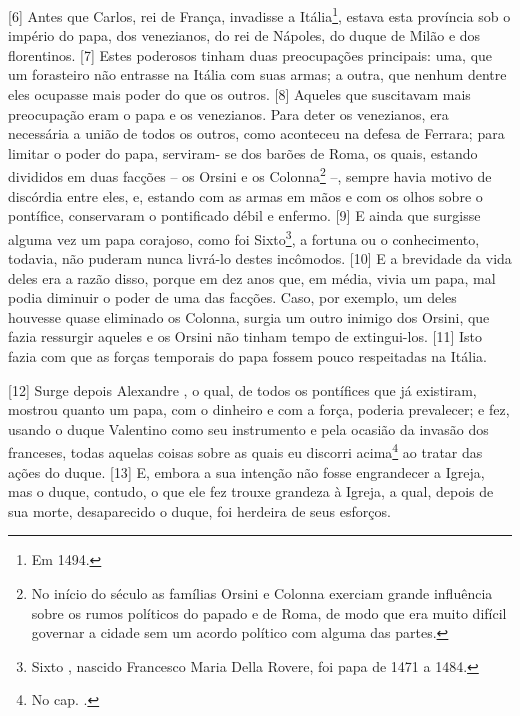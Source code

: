 {[}6{]} Antes que Carlos, rei de França, invadisse a Itália\footnote{Em
  1494.}, estava esta província sob o império do papa, dos venezianos,
do rei de Nápoles, do duque de Milão e dos florentinos. {[}7{]} Estes
poderosos tinham duas preocupações principais: uma, que um forasteiro
não entrasse na Itália com suas armas; a outra, que nenhum dentre eles
ocupasse mais poder do que os outros. {[}8{]} Aqueles que suscitavam
mais preocupação eram o papa e os venezianos. Para deter os venezianos,
era necessária a união de todos os outros, como aconteceu na defesa de
Ferrara; para limitar o poder do papa, serviram- se dos barões de Roma,
os quais, estando divididos em duas facções -- os Orsini e os
Colonna\footnote{No início do século  as famílias Orsini e Colonna
  exerciam grande influência sobre os rumos políticos do papado e de
  Roma, de modo que era muito difícil governar a cidade sem um acordo
  político com alguma das partes.} --, sempre havia motivo de discórdia
entre eles, e, estando com as armas em mãos e com os olhos sobre o
pontífice, conservaram o pontificado débil e enfermo. {[}9{]} E ainda
que surgisse alguma vez um papa corajoso, como foi Sixto\footnote{Sixto
  , nascido Francesco Maria Della Rovere, foi papa de 1471 a 1484.}, a
fortuna ou o conhecimento, todavia, não puderam nunca livrá-lo destes
incômodos. {[}10{]} E a brevidade da vida deles era a razão disso,
porque em dez anos que, em média, vivia um papa, mal podia diminuir o
poder de uma das facções. Caso, por exemplo, um deles houvesse quase
eliminado os Colonna, surgia um outro inimigo dos Orsini, que fazia
ressurgir aqueles e os Orsini não tinham tempo de extingui-los. {[}11{]}
Isto fazia com que as forças temporais do papa fossem pouco respeitadas
na Itália.

{[}12{]} Surge depois Alexandre , o qual, de todos os pontífices que
já existiram, mostrou quanto um papa, com o dinheiro e com a força,
poderia prevalecer; e fez, usando o duque Valentino como seu instrumento
e pela ocasião da invasão dos franceses, todas aquelas coisas sobre as
quais eu discorri acima\footnote{No cap. .} ao tratar das ações do
duque. {[}13{]} E, embora a sua intenção não fosse engrandecer a Igreja,
mas o duque, contudo, o que ele fez trouxe grandeza à Igreja, a qual,
depois de sua morte, desaparecido o duque, foi herdeira de seus
esforços.

